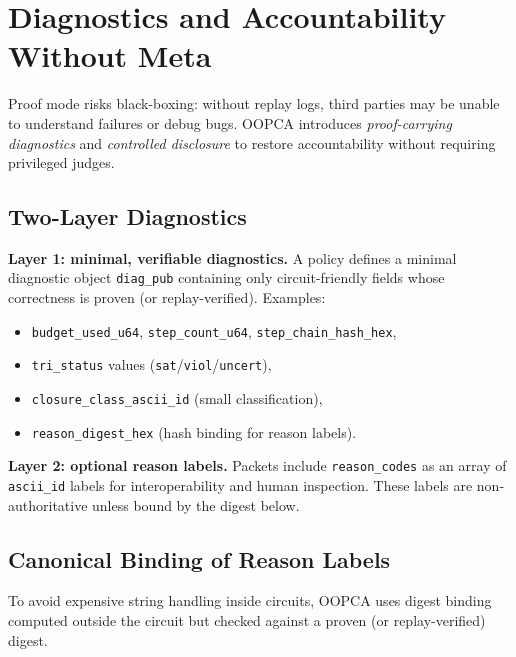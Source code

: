 \documentclass[11pt]{article}
\begin{document}
\section{Diagnostics and Accountability Without Meta}\label{sec:diag}

Proof mode risks black-boxing: without replay logs, third parties may be unable to understand failures or debug bugs. OOPCA introduces \emph{proof-carrying diagnostics} and \emph{controlled disclosure} to restore accountability without requiring privileged judges.

\subsection{Two-Layer Diagnostics}

\textbf{Layer 1: minimal, verifiable diagnostics.}
A policy defines a minimal diagnostic object \texttt{diag\_pub} containing only circuit-friendly fields whose correctness is proven (or replay-verified). Examples:
\begin{itemize}[leftmargin=1.2em]
  \item \texttt{budget\_used\_u64}, \texttt{step\_count\_u64}, \texttt{step\_chain\_hash\_hex},
  \item \texttt{tri\_status} values (\texttt{sat}/\texttt{viol}/\texttt{uncert}),
  \item \texttt{closure\_class\_ascii\_id} (small classification),
  \item \texttt{reason\_digest\_hex} (hash binding for reason labels).
\end{itemize}

\textbf{Layer 2: optional reason labels.}
Packets include \texttt{reason\_codes} as an array of \texttt{ascii\_id} labels for interoperability and human inspection. These labels are non-authoritative unless bound by the digest below.

\subsection{Canonical Binding of Reason Labels}

To avoid expensive string handling inside circuits, OOPCA uses digest binding computed outside the circuit but checked against a proven (or replay-verified) digest.
\end{document}
